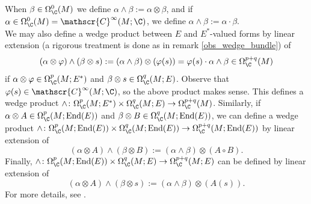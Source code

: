 When \(\beta \in \Omega_\C^0(M)\) we define \(\alpha \wedge \beta:=\alpha \otimes \beta\), and if \(\alpha \in \Omega_\C^0(M)=\mathscr{C}^\infty(M;\C)\), we define \(\alpha \wedge \beta:=\alpha \cdot \beta\). \\

We may also define a wedge product between \(E\) and \(E^*\)-valued forms by linear extension (a rigorous treatment is done as in remark \ref{obs_wedge_bundle}) of
\[
(\alpha \otimes \varphi) \wedge (\beta \otimes s):=(\alpha \wedge \beta) \otimes (\varphi(s))=\varphi(s) \cdot \alpha \wedge \beta \in \Omega_\C^{p+q}(M)
\]
if \(\alpha \otimes \varphi \in \Omega_\C^p(M;E^*)\) and \(\beta \otimes s \in \Omega_\C^q(M;E)\). Observe that \(\varphi(s) \in \mathscr{C}^\infty(M;\C)\), so the above product makes sense. This defines a wedge product \(\wedge\colon \Omega_\C^p(M;E^*) \times \Omega_\C^q(M;E) \to \Omega_\C^{p+q}(M)\). Similarly, if \(\alpha \otimes A \in \Omega_\C^p(M; \mathrm{End}(E))\) and \(\beta \otimes B \in \Omega_\C^q(M; \mathrm{End}(E))\), we can define a wedge product \(\wedge \colon\Omega_\C^p(M; \mathrm{End}(E)) \times \Omega_\C^q(M; \mathrm{End}(E)) \to \Omega_\C^{p+q}(M; \mathrm{End}(E))\) by linear extension of
\[
(\alpha \otimes A) \wedge (\beta \otimes B):=(\alpha \wedge \beta) \otimes (A \circ B).
\]
Finally, \(\wedge \colon \Omega_\C^p(M; \mathrm{End}(E)) \times \Omega_\C^q(M;E) \to \Omega_\C^{p+q}(M;E)\) can be defined by linear extension of
\[
(\alpha \otimes A) \wedge (\beta \otimes s):=(\alpha \wedge \beta) \otimes (A(s)).
\]
For more details, see \parencite[Ch. 4]{lee_introCM}. \\

